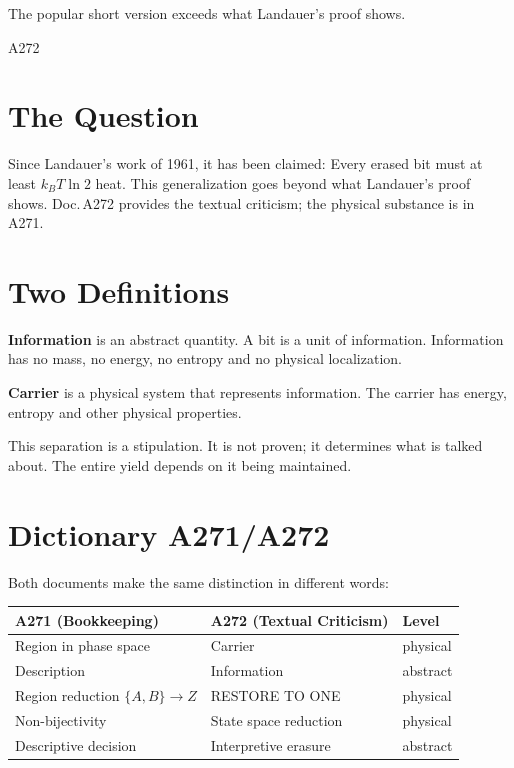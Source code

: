 \label{ch:traeger}

\epigraph{The popular short version exceeds what Landauer's proof shows.}{A272}

\section{The Question}

Since Landauer's work of 1961, it has been claimed: Every erased bit must at least
$k_BT\ln 2$ heat. This generalization goes beyond what
Landauer's proof shows. Doc.\,A272 provides the textual criticism; the physical substance
is in A271.

\section{Two Definitions}

\textbf{Information} is an abstract quantity. A bit is a unit of
information. Information has no mass, no energy, no entropy and no
physical localization.

\textbf{Carrier} is a physical system that represents information.
The carrier has energy, entropy and other physical properties.

This separation is a stipulation. It is not proven; it determines what is
talked about. The entire yield depends on it being maintained.

\section{Dictionary A271/A272}

Both documents make the same distinction in different words:

\begin{center}
\begingroup\small
\begin{tabular}{@{}p{2.8cm}p{2.8cm}p{2.0cm}@{}}
\toprule
\textbf{A271 (Bookkeeping)} & \textbf{A272 (Textual Criticism)} & \textbf{Level} \\
\midrule
Region in phase space & Carrier & physical \\
Description & Information & abstract \\
Region reduction $\{A,B\}\to Z$ & RESTORE TO ONE & physical \\
Non-bijectivity & State space reduction & physical \\
Descriptive decision & Interpretive erasure & abstract \\
\bottomrule
\end{tabular}
\endgroup
\end{center}

